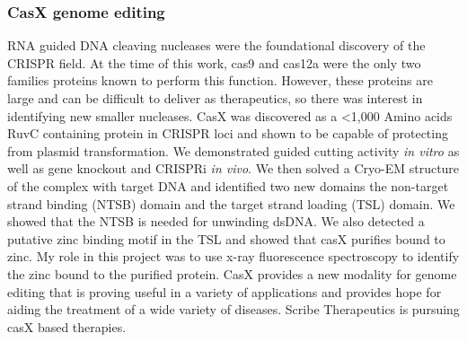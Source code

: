 \documentclass{article}
\begin{document}
\subsubsection{CasX genome editing}
RNA guided DNA cleaving nucleases were the foundational discovery of the CRISPR field.
At the time of this work, cas9 and cas12a were the only two families proteins known to perform this function.
However, these proteins are large and can be difficult to deliver as therapeutics, so there was interest in identifying new smaller nucleases.
CasX was discovered as a <1,000 Amino acids RuvC containing protein in CRISPR loci and shown to be capable of protecting from plasmid transformation.
We demonstrated guided cutting activity \textit{in vitro} as well as gene knockout and CRISPRi \textit{in vivo}.
We then solved a Cryo-EM structure of the complex with target DNA and identified two new domains the non-target strand binding (NTSB) domain and the target strand loading (TSL) domain.
We showed that the NTSB is needed for unwinding dsDNA.
We also detected a putative zinc binding motif in the TSL and showed that casX purifies bound to zinc.
My role in this project was to use x-ray fluorescence spectroscopy to identify the zinc bound to the purified protein.
CasX provides a new modality for genome editing that is proving useful in a variety of applications and provides hope for aiding the treatment of a wide variety of diseases.
Scribe Therapeutics is pursuing casX based therapies.
%
\end{document}
